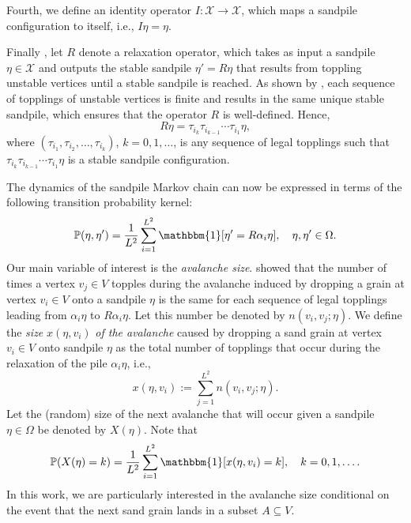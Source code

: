 \documentclass{article}
\begin{document}
Fourth, we define an identity operator $I: \mathcal{X} \rightarrow \mathcal{X}$, which maps a sandpile configuration to itself, i.e., $I \eta = \eta$.

Finally , let $R$ denote a relaxation operator, which takes as input a sandpile $\eta \in \mathcal{X}$ and outputs the stable sandpile $\eta' = R \eta$ that results from toppling unstable vertices until a stable sandpile is reached. As shown by \citet{Dhar}, each sequence of topplings of unstable vertices is finite and results in the same unique stable sandpile, which ensures that the operator $R$ is well-defined. Hence, 
    \begin{equation*}
        R\eta = \tau_{i_k} \tau_{i_{k-1}} \cdots \tau_{i_1} \eta,
    \end{equation*}
    where $(\tau_{i_1}, \tau_{i_2}, \ldots, \tau_{i_k})$, $k = 0, 1, \ldots$, is any sequence of legal topplings such that $\tau_{i_k} \tau_{i_{k-1}} \cdots \tau_{i_1} \eta$ is a stable sandpile configuration.  

The dynamics of the sandpile Markov chain can now be expressed in terms of the following transition probability kernel:
\begin{equation*}
    \mathbb{P}(\eta, \eta') = \dfrac{1}{L^2} \sum\limits_{i = 1}^{L^2}  \mathbbm{1}[\eta' = R\alpha_i \eta], \quad \eta, \eta' \in \Omega.
\end{equation*}
Our main variable of interest is the \textit{avalanche size}. \citet{Dhar} showed that the number of times a vertex $v_j \in V$ topples during the avalanche induced by dropping a grain at vertex $v_i \in V$ onto a sandpile $\eta$ is the same for each sequence of legal topplings leading from $\alpha_i \eta$ to $R \alpha_i \eta$. Let this number be denoted by $n(v_i, v_j; \eta)$. We define the \textit{size} $x(\eta, v_i)$ \textit{of the avalanche} caused by dropping a sand grain at vertex $v_i \in V$ onto sandpile $\eta$ as the total number of topplings that occur during the relaxation of the pile $\alpha_i \eta$, i.e., 
\begin{equation*}
    x(\eta, v_i) := \sum\limits_{j = 1}^{L^2} n(v_i, v_j; \eta).
\end{equation*}
Let the (random) size of the next avalanche that will occur given a sandpile $\eta \in \Omega$ be denoted by $X(\eta)$.
Note that 
\begin{equation*}
    \mathbb{P}(X(\eta) = k) = \dfrac{1}{L^2} \sum\limits_{i=1}^{L^2}  \mathbbm{1}[x(\eta, v_i) = k], \quad k = 0, 1, \ldots.
\end{equation*}
In this work, we are particularly interested in the avalanche size conditional on the event that the next sand grain lands in a subset $A \subseteq V$. 
\end{document}
